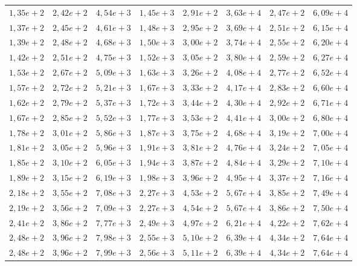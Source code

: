 \documentclass [11pt]{articleSBPO}
\begin{document}
\begin{table}
\begin{tabular}{|m{1.3cm}|m{1.3cm}|m{1.3cm}|m{1.3cm}|m{1.3cm}|m{1.3cm}|m{1.3cm}||m{1.5cm}|}
		 $ 1,35e+2 $ & $ 2,42e+2 $ & $ 4,54e+3 $ & $ 1,45e+3 $ & $ 2,91e+2 $ & $ 3,63e+4 $ & $ 2,47e+2 $ & $ 6,09e+4 $ \\
		 $ 1,37e+2 $ & $ 2,45e+2 $ & $ 4,61e+3 $ & $ 1,48e+3 $ & $ 2,95e+2 $ & $ 3,69e+4 $ & $ 2,51e+2 $ & $ 6,15e+4 $ \\
		 $ 1,39e+2 $ & $ 2,48e+2 $ & $ 4,68e+3 $ & $ 1,50e+3 $ & $ 3,00e+2 $ & $ 3,74e+4 $ & $ 2,55e+2 $ & $ 6,20e+4 $ \\
		 $ 1,42e+2 $ & $ 2,51e+2 $ & $ 4,75e+3 $ & $ 1,52e+3 $ & $ 3,05e+2 $ & $ 3,80e+4 $ & $ 2,59e+2 $ & $ 6,27e+4 $ \\
		 $ 1,53e+2 $ & $ 2,67e+2 $ & $ 5,09e+3 $ & $ 1,63e+3 $ & $ 3,26e+2 $ & $ 4,08e+4 $ & $ 2,77e+2 $ & $ 6,52e+4 $ \\
		 $ 1,57e+2 $ & $ 2,72e+2 $ & $ 5,21e+3 $ & $ 1,67e+3 $ & $ 3,33e+2 $ & $ 4,17e+4 $ & $ 2,83e+2 $ & $ 6,60e+4 $ \\
		 $ 1,62e+2 $ & $ 2,79e+2 $ & $ 5,37e+3 $ & $ 1,72e+3 $ & $ 3,44e+2 $ & $ 4,30e+4 $ & $ 2,92e+2 $ & $ 6,71e+4 $ \\
		 $ 1,67e+2 $ & $ 2,85e+2 $ & $ 5,52e+3 $ & $ 1,77e+3 $ & $ 3,53e+2 $ & $ 4,41e+4 $ & $ 3,00e+2 $ & $ 6,80e+4 $ \\
		 $ 1,78e+2 $ & $ 3,01e+2 $ & $ 5,86e+3 $ & $ 1,87e+3 $ & $ 3,75e+2 $ & $ 4,68e+4 $ & $ 3,19e+2 $ & $ 7,00e+4 $ \\
		 $ 1,81e+2 $ & $ 3,05e+2 $ & $ 5,96e+3 $ & $ 1,91e+3 $ & $ 3,81e+2 $ & $ 4,76e+4 $ & $ 3,24e+2 $ & $ 7,05e+4 $ \\
		 $ 1,85e+2 $ & $ 3,10e+2 $ & $ 6,05e+3 $ & $ 1,94e+3 $ & $ 3,87e+2 $ & $ 4,84e+4 $ & $ 3,29e+2 $ & $ 7,10e+4 $ \\
		 $ 1,89e+2 $ & $ 3,15e+2 $ & $ 6,19e+3 $ & $ 1,98e+3 $ & $ 3,96e+2 $ & $ 4,95e+4 $ & $ 3,37e+2 $ & $ 7,16e+4 $ \\
		 $ 2,18e+2 $ & $ 3,55e+2 $ & $ 7,08e+3 $ & $ 2,27e+3 $ & $ 4,53e+2 $ & $ 5,67e+4 $ & $ 3,85e+2 $ & $ 7,49e+4 $ \\
		 $ 2,19e+2 $ & $ 3,56e+2 $ & $ 7,09e+3 $ & $ 2,27e+3 $ & $ 4,54e+2 $ & $ 5,67e+4 $ & $ 3,86e+2 $ & $ 7,50e+4 $ \\
		 $ 2,41e+2 $ & $ 3,86e+2 $ & $ 7,77e+3 $ & $ 2,49e+3 $ & $ 4,97e+2 $ & $ 6,21e+4 $ & $ 4,22e+2 $ & $ 7,62e+4 $ \\
		 $ 2,48e+2 $ & $ 3,96e+2 $ & $ 7,98e+3 $ & $ 2,55e+3 $ & $ 5,10e+2 $ & $ 6,39e+4 $ & $ 4,34e+2 $ & $ 7,64e+4 $ \\
		 $ 2,48e+2 $ & $ 3,96e+2 $ & $ 7,99e+3 $ & $ 2,56e+3 $ & $ 5,11e+2 $ & $ 6,39e+4 $ & $ 4,34e+2 $ & $ 7,64e+4 $ \\

\end{tabular}
\end{table}
\end{document}
